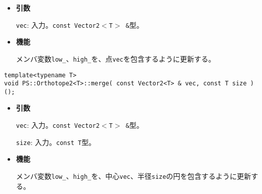 \begin{itemize}

\item{{\bf 引数}}

\texttt{vec}: 入力。\texttt{const Vector2$<$T$>$ \&}型。

\item{{\bf 機能}}

メンバ変数\texttt{low\_}、\texttt{high\_}を、点\texttt{vec}を包含するように更新する。

\end{itemize}
\begin{screen}
\begin{verbatim}
template<typename T>
void PS::Orthotope2<T>::merge( const Vector2<T> & vec, const T size )();
\end{verbatim}
\end{screen}

\begin{itemize}

\item{{\bf 引数}}

\texttt{vec}: 入力。\texttt{const Vector2$<$T$>$ \&}型。

\texttt{size}: 入力。\texttt{const T}型。

\item{{\bf 機能}}

メンバ変数\texttt{low\_}、\texttt{high\_}を、中心\texttt{vec}、半径\texttt{size}の円を包含するように更新する。

\end{itemize}

